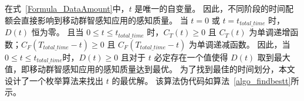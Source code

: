在式~\eqref{Formula_DataAmount}中，$t$ 是唯一的自变量。
因此，不同阶段的时间配额会直接影响到移动群智感知应用的感知质量。
当 $t=0$ 或 $t=t_{total\_time}$ 时，$D(t)$ 恒为零。
且当 $0 \leq t \leq t_{total\_time}$ 时，$C_T(t)\geq 0$ 且 $C_T(t)$ 为单调递增函数；$C_F(T_{total\_time}-t) \geq 0$ 且 $C_F(T_{total\_time}-t)$ 为单调递减函数。
因此，当$0 \leq t \leq t_{total\_time}$时，$D(t) \geq 0$ 且对于 $t$ 必定存在一个值使得 $D(t)$ 取到最大值，即移动群智感知应用的感知质量达到最优。
为了找到最佳的时间划分，本文设计了一个枚举算法来找出 $t$ 的最优解。
该算法伪代码如算法~\ref{algo_findbestt}所示。


